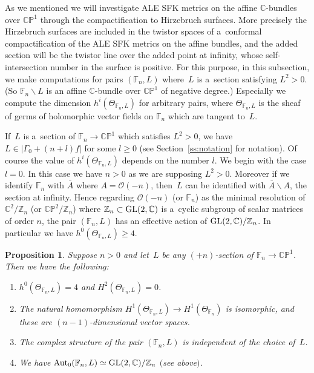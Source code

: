 \documentclass[pdftex]{sigma}
\numberwithin{equation}{section}
\newtheorem{Proposition}[Theorem]{Proposition}
{\theoremstyle{definition}
\newtheorem{Definition}[Theorem]{Definition}
\newtheorem{Remark}[Theorem]{Remark}
}
\begin{document}
As we mentioned we will investigate ALE SFK metrics on the af\/f\/ine $\mathbb{C}$-bundles over $\mathbb{CP}^1$ through
the compactif\/ication to Hirzebruch surfaces.
More precisely the Hirzebruch surfaces are included in the twistor spaces of a~conformal compactif\/ication of the ALE
SFK metrics on the af\/f\/ine bundles, and the added section will be the twistor line over the added point at
inf\/inity, whose self-intersection number in the surface is positive.
For this purpose, in this subsection, we make computations for pairs $(\mathbb{F}_n,L)$ where~$L$ is a~section
satisfying $L^2>0$.
(So $\mathbb{F}_n\backslash L$ is an af\/f\/ine $\mathbb{C}$-bundle over $\mathbb{CP}^1$ of negative degree.) Especially
we compute the dimension $h^i(\Theta_{\mathbb{F}_n,L})$ for arbitrary pairs, where $\Theta_{\mathbb{F}_n,L}$ is the
sheaf of germs of holomorphic vector f\/ields on $\mathbb{F}_n$ which are tangent to~$L$.

If~$L$ is a~section of $\mathbb{F}_n\to\mathbb{CP}^1$ which satisf\/ies $L^2>0$, we have $L\in |\Gamma_0 + (n+l)f|$ for
some $l\ge 0$ (see Section~\ref{ss:notation} for notation). Of course the value of $h^i(\Theta_{\mathbb{F}_n,L})$
depends on the number $l$.
We begin with the case $l=0$.
In this case we have $n>0$ as we are supposing $L^2>0$.
Moreover if we identify $\mathbb{F}_n$ with $\overline A$ where $A=\mathscr O(-n)$, then~$L$ can be identif\/ied with
$\overline A\backslash A$, the section at inf\/inity.
Hence regarding $\mathscr O(-n)$ (or $\mathbb{F}_n$) as the minimal resolution of $\mathbb{C}^2/\mathbb{Z}_n$ (or
$\mathbb{CP}^2/\mathbb{Z}_n$) where $\mathbb{Z}_n\subset{\rm{GL}}(2,\mathbb{C})$ is a~cyclic subgroup of scalar matrices
of order $n$, the pair $(\mathbb{F}_n,L)$ has an ef\/fective action of ${\rm{GL}}(2,\mathbb{C})/\mathbb{Z}_n$.
In particular we have $h^0(\Theta_{\mathbb{F}_n,L}) \ge 4$.
\begin{Proposition}
\label{prop:l0}
Suppose $n>0$ and let~$L$ be any $(+n)$-section of $\mathbb{F}_n\to\mathbb{CP}^1$.
Then we have the following:
\begin{enumerate}\itemsep=0pt
\item[$(i)$] $h^0(\Theta_{\mathbb{F}_n, L})=4$ and $H^2(\Theta_{\mathbb{F}_n, L})=0$.
\item[$(ii)$] The natural homomorphism $H^1(\Theta_{\mathbb{F}_n, L}) \to H^1(\Theta_{\mathbb{F}_n})$ is isomorphic,
and these are $(n-1)$-dimensional vector spaces.
\item[$(iii)$] The complex structure of the pair $(\mathbb{F}_n,L)$ is independent of the choice of~$L$.
\item[$(iv)$] We have ${\rm{Aut}}_0(\mathbb{F}_n,L)\simeq {\rm{GL}}(2,\mathbb{C})/\mathbb{Z}_n$ $($see above$)$.
\end{enumerate}
\end{Proposition}
\end{document}
